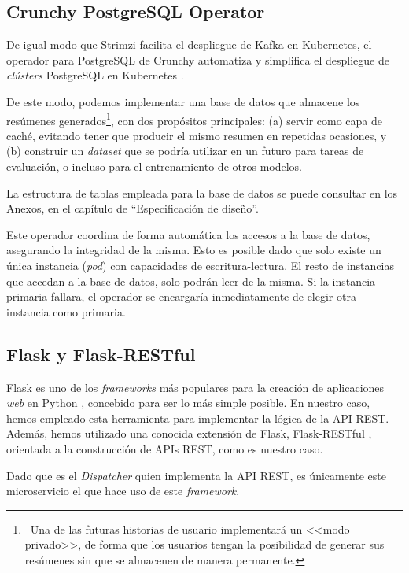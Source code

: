 \subsection{Crunchy PostgreSQL Operator}

De igual modo que Strimzi facilita el despliegue de Kafka en Kubernetes, el operador para PostgreSQL de Crunchy automatiza y simplifica el despliegue de \emph{clústers} PostgreSQL en Kubernetes \cite{crunchy21}.

De este modo, podemos implementar una base de datos que almacene los resúmenes generados\footnote{\, Una de las futuras historias de usuario implementará un <<modo privado>>, de forma que los usuarios tengan la posibilidad de generar sus resúmenes sin que se almacenen de manera permanente.}, con dos propósitos principales: (a) servir como capa de caché, evitando tener que producir el mismo resumen en repetidas ocasiones, y (b) construir un \emph{dataset} que se podría utilizar en un futuro para tareas de evaluación, o incluso para el entrenamiento de otros modelos.

La estructura de tablas empleada para la base de datos se puede consultar en los Anexos, en el capítulo de ``Especificación de diseño''.

Este operador coordina de forma automática los accesos a la base de datos, asegurando la integridad de la misma. Esto es posible dado que solo existe un única instancia (\emph{pod}) con capacidades de escritura-lectura. El resto de instancias que accedan a la base de datos, solo podrán leer de la misma. Si la instancia primaria fallara, el operador se encargaría inmediatamente de elegir otra instancia como primaria.


\subsection{Flask y Flask-RESTful}

Flask es uno de los \emph{frameworks} más populares para la creación de aplicaciones \emph{web} en Python \cite{flask}, concebido para ser lo más simple posible. En nuestro caso, hemos empleado esta herramienta para implementar la lógica de la API REST. Además, hemos utilizado una conocida extensión de Flask, Flask-RESTful \cite{flaskRestful}, orientada a la construcción de APIs REST, como es nuestro caso.

Dado que es el \emph{Dispatcher} quien implementa la API REST, es únicamente este microservicio el que hace uso de este \emph{framework}.


